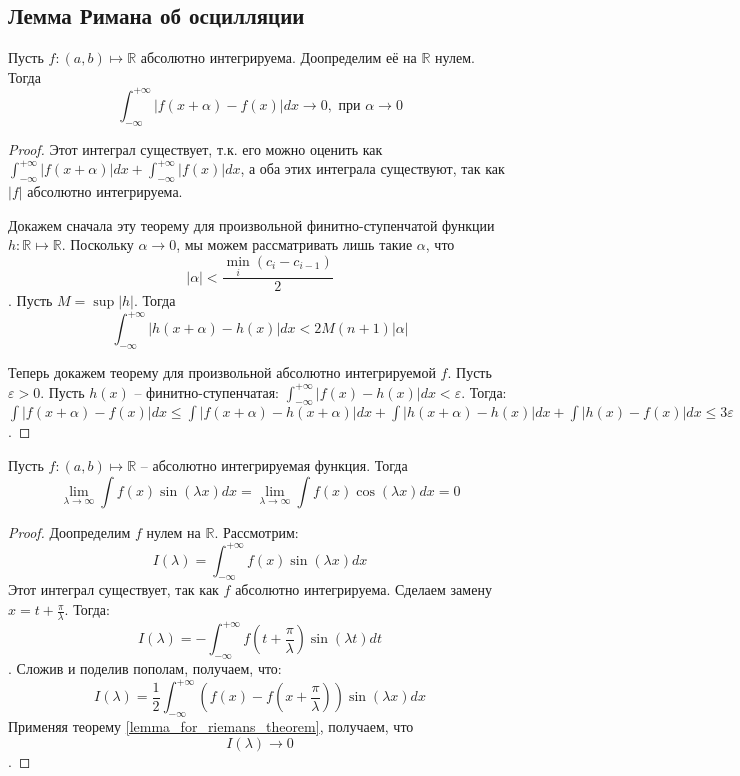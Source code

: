 \documentclass[document.tex]{subfiles}
\begin{document}
\subsection{Лемма Римана об осцилляции}
\begin{theorem}
    \label{lemma_for_riemans_theorem}
Пусть $f: (a, b) \mapsto \mathbb{R}$ абсолютно интегрируема. Доопределим её на $\mathbb{R}$ нулем. Тогда $$\int_{-\infty}^{+\infty} |f(x + \alpha) - f(x)|dx \rightarrow 0, \text{ при } \alpha \rightarrow 0$$
\end{theorem}
\begin{proof}
Этот интеграл существует, т.к. его можно оценить как $\int_{-\infty}^{+\infty}|f(x+\alpha)|dx +
\int_{-\infty}^{+\infty}|f(x)|dx$, а оба этих интеграла существуют, так как $|f|$ абсолютно интегрируема.

Докажем сначала эту теорему для произвольной финитно-ступенчатой функции $h: \mathbb{R} \mapsto \mathbb{R}$. Поскольку $\alpha \rightarrow 0$, мы можем рассматривать лишь такие $\alpha$, что $$|\alpha| < \frac{\min_i (c_i - c_{i-1})}{2}$$. Пусть $M = \sup |h|$. Тогда
$$\int_{-\infty}^{+\infty} |h(x + \alpha) - h(x)|dx < 2M(n+1)|\alpha|$$ 

Теперь докажем теорему для произвольной абсолютно интегрируемой $f$. Пусть $\varepsilon > 0$. Пусть $h(x)$ --
финитно-ступенчатая: $\int_{-\infty}^{+\infty}|f(x) - h(x)|dx < \varepsilon$. Тогда:
$\int |f(x+\alpha) - f(x)|dx \leq \int|f(x+\alpha)-h(x+\alpha)|dx + \int|h(x+\alpha)-h(x)|dx + \int|h(x)-f(x)|dx \leq 3\varepsilon$.
\end{proof}

\begin{lemma}
Пусть $f : (a, b) \mapsto \mathbb{R}$ -- абсолютно интегрируемая функция. Тогда
$$\lim_{\lambda \rightarrow \infty} \int f(x)\sin (\lambda x)dx = \lim_{\lambda \rightarrow \infty} \int f(x)\cos (\lambda x)dx = 0$$
\end{lemma}
\begin{proof}
Доопределим $f$ нулем на $\mathbb{R}$. Рассмотрим:
$$I(\lambda) = \int_{-\infty}^{+\infty}f(x)\sin(\lambda x)dx$$
Этот интеграл существует, так как $f$ абсолютно интегрируема. Сделаем замену $x = t + \frac{\pi}{\lambda}$.
Тогда:
$$I(\lambda) = -\int_{-\infty}^{+\infty}f \left( t + \frac{\pi}{\lambda} \right) \sin(\lambda t)dt$$.
Сложив и поделив пополам, получаем, что:
$$I(\lambda) = \frac{1}{2} \int_{-\infty}^{+\infty} \left( f(x) - f \left( x+\frac{\pi}{\lambda} \right) \right) \sin(\lambda x)dx$$
Применяя теорему \ref{lemma_for_riemans_theorem}, получаем, что $$I(\lambda) \rightarrow 0$$.
\end{proof}
\end{document}
